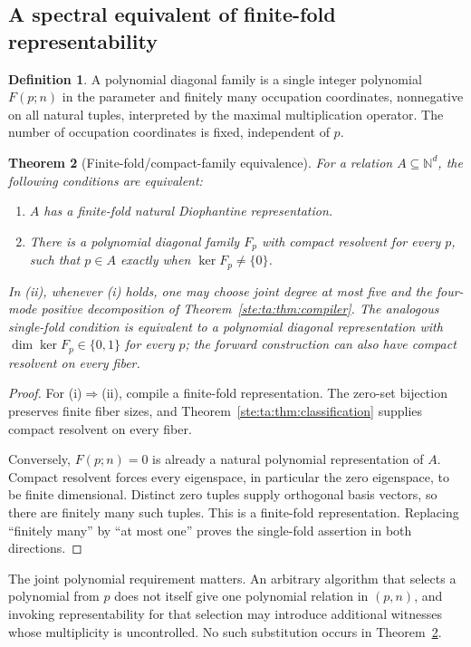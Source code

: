 \documentclass[11pt,letterpaper]{article}
\newtheorem{theorem}{Theorem}[section]
\theoremstyle{definition}
\newtheorem{definition}[theorem]{Definition}
\theoremstyle{remark}
\newcommand{\N}{\mathbb N}
\begin{document}
\subsection{A spectral equivalent of finite-fold representability}
\begin{definition}
A polynomial diagonal family is a single integer polynomial $F(p;n)$ in the parameter and finitely many occupation coordinates, nonnegative on all natural tuples, interpreted by the maximal multiplication operator. The number of occupation coordinates is fixed, independent of $p$.
\end{definition}

\begin{theorem}[Finite-fold/compact-family equivalence]\label{ste:ta:thm:finitefold}
For a relation $A\subseteq\N^d$, the following conditions are equivalent:
\begin{enumerate}[label=(\roman*),itemsep=1pt]
\item $A$ has a finite-fold natural Diophantine representation.
\item There is a polynomial diagonal family $F_p$ with compact resolvent for every $p$, such that $p\in A$ exactly when $\ker F_p\ne\{0\}$.
\end{enumerate}
In (ii), whenever (i) holds, one may choose joint degree at most five and the four-mode positive decomposition of Theorem~\ref{ste:ta:thm:compiler}. The analogous single-fold condition is equivalent to a polynomial diagonal representation with $\dim\ker F_p\in\{0,1\}$ for every $p$; the forward construction can also have compact resolvent on every fiber.
\end{theorem}
\begin{proof}
For (i)$\Rightarrow$(ii), compile a finite-fold representation. The zero-set bijection preserves finite fiber sizes, and Theorem~\ref{ste:ta:thm:classification} supplies compact resolvent on every fiber.

Conversely, $F(p;n)=0$ is already a natural polynomial representation of $A$. Compact resolvent forces every eigenspace, in particular the zero eigenspace, to be finite dimensional. Distinct zero tuples supply orthogonal basis vectors, so there are finitely many such tuples. This is a finite-fold representation. Replacing ``finitely many'' by ``at most one'' proves the single-fold assertion in both directions.
\end{proof}

The joint polynomial requirement matters. An arbitrary algorithm that selects a polynomial from $p$ does not itself give one polynomial relation in $(p,n)$, and invoking representability for that selection may introduce additional witnesses whose multiplicity is uncontrolled. No such substitution occurs in Theorem~\ref{ste:ta:thm:finitefold}.
\end{document}
